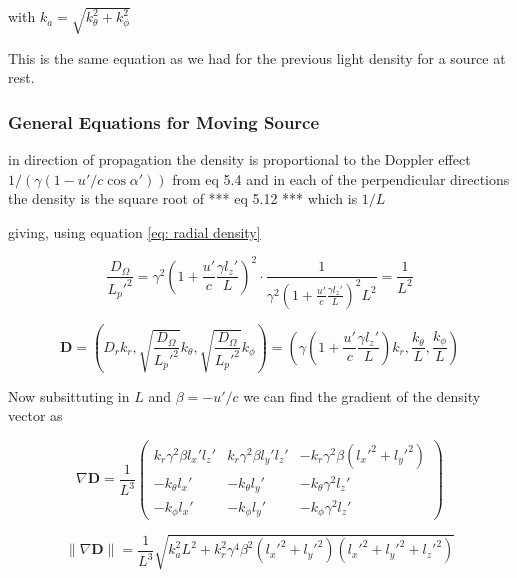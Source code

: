 with $k_{a}=\sqrt{k_\theta^2 + k_\phi^2}$

This is the same equation as we had for the previous light density for a source at rest.

\subsubsection{General Equations for Moving Source}\label{subsubsect: General Equations for Moving Source 2}

in direction of propagation the density is proportional to the Doppler effect $ 1/ ( \gamma( 1 - u'/c \cos{\alpha'}) )$ from eq 5.4 and in each of the perpendicular directions the density is the square root of *** eq 5.12 *** which is  $ 1/ L$

giving, using equation \eqref{eq: radial density}

\begin{equation}
	\frac{D_\Omega}{L_p'^2} =  {\gamma}^2\left(1 + \dfrac{u'}{c}\frac{\gamma l_z'}{L}\right)^2 \cdot \frac{1}{\gamma^2 \left( 1 + \frac{u'}{c} \frac{\gamma l_z'}{L} \right)^2 L^2} = \frac{1}{L^2}
\end{equation}

\begin{equation}
	\mathbf{D} = \left( D_r k_r , \sqrt{\frac{D_\Omega}{L_p'^2}} k_\theta, \sqrt{\frac{D_\Omega}{L_p'^2}}k_\phi \right) = \left({\gamma}\left(1 + \dfrac{u'}{c}\frac{\gamma l_z'}{L}\right) k_r , \frac{k_\theta}{L}, \frac{k_\phi}{L} \right)
\end{equation}

Now subsittuting in $L$ and $\beta = - u'/c$ we can find the gradient of the density vector as

\begin{derivation}


\begin{equation}
	\nabla \mathbf{D} = \frac{1}{L^3}
	\begin{pmatrix}
		k_r \gamma^2 \beta l_x'l_z' & k_r \gamma^2 \beta l_y'l_z' & - k_r \gamma^2 \beta (l_x'^2 +l_y'^2)  \\
		-k_\theta l_x' & -k_\theta l_y' & -k_\theta\gamma^2 l_z' \\
		-k_\phi l_x' & -k_\phi l_y' & -k_\phi\gamma^2 l_z'
	\end{pmatrix}
\end{equation}

\begin{equation}
	\| \nabla \mathbf{D} \| = \frac{1}{L^3} \sqrt{ k_{a}^2 L^2 + k_r^2 \gamma^4 \beta^2  (l_x'^2+l_y'^2)( l_x'^2 + l_y'^2 + l_z'^2 )}
\end{equation}

\end{derivation}

